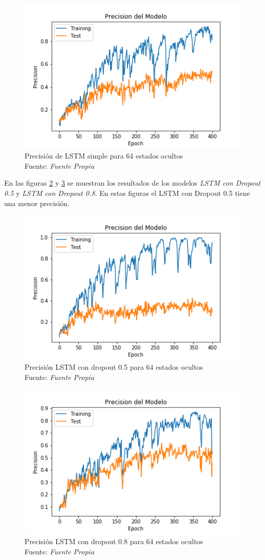 \begin{figure}[H]
	\centering
	\includegraphics[width=0.7\linewidth]{Figures/lstm13_64_prec}
	\caption{Precisión de LSTM simple para 64 estados ocultos\\ Fuente: {\textit{Fuente Propia}}}
	\label{fig:lstm1364prec}
\end{figure}
\newpage
En las figuras \ref{fig:lstm6405prec} y \ref{fig:lstm6408prec} se muestran los resultados de los modelos \textit{LSTM con Dropout 0.5} y \textit{LSTM con Dropout 0.8}. En estas figuras el LSTM con Dropout 0.5 tiene una menor precisión.\\ 
\begin{figure}[H]
	\centering
	\includegraphics[width=0.7\linewidth]{Figures/lstm_64_05_prec}
	\caption{Precisión LSTM con dropout 0.5 para 64 estados ocultos\\ Fuente: {\textit{Fuente Propia}}}
	\label{fig:lstm6405prec}
\end{figure}
\begin{figure}[H]
	\centering
	\includegraphics[width=0.7\linewidth]{Figures/lstm_64_08_prec}
	\caption{Precisión LSTM con dropout 0.8 para 64 estados ocultos\\ Fuente: {\textit{Fuente Propia}}}
	\label{fig:lstm6408prec}
\end{figure}
